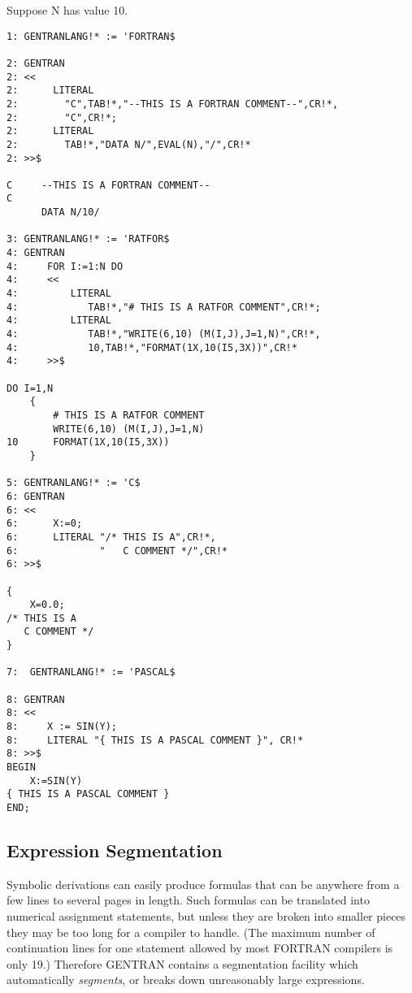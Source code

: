 \begin{describe}{\example}
Suppose N has value 10.
\begin{verbatim}
1: GENTRANLANG!* := 'FORTRAN$ 

2: GENTRAN 
2: << 
2:      LITERAL 
2:        "C",TAB!*,"--THIS IS A FORTRAN COMMENT--",CR!*, 
2:        "C",CR!*; 
2:      LITERAL 
2:        TAB!*,"DATA N/",EVAL(N),"/",CR!* 
2: >>$ 

C     --THIS IS A FORTRAN COMMENT--
C
      DATA N/10/

3: GENTRANLANG!* := 'RATFOR$ 
4: GENTRAN 
4:     FOR I:=1:N DO 
4:     << 
4:         LITERAL 
4:            TAB!*,"# THIS IS A RATFOR COMMENT",CR!*; 
4:         LITERAL 
4:            TAB!*,"WRITE(6,10) (M(I,J),J=1,N)",CR!*, 
4:            10,TAB!*,"FORMAT(1X,10(I5,3X))",CR!* 
4:     >>$ 

DO I=1,N
    {
        # THIS IS A RATFOR COMMENT
        WRITE(6,10) (M(I,J),J=1,N)
10      FORMAT(1X,10(I5,3X))
    }

5: GENTRANLANG!* := 'C$ 
6: GENTRAN 
6: << 
6:      X:=0; 
6:      LITERAL "/* THIS IS A",CR!*, 
6:              "   C COMMENT */",CR!* 
6: >>$ 

{
    X=0.0;
/* THIS IS A
   C COMMENT */
}

7:  GENTRANLANG!* := 'PASCAL$

8: GENTRAN
8: <<
8:     X := SIN(Y);
8:     LITERAL "{ THIS IS A PASCAL COMMENT }", CR!*
8: >>$
BEGIN
    X:=SIN(Y)
{ THIS IS A PASCAL COMMENT }
END;

\end{verbatim}
\end{describe}
\subsection{Expression Segmentation}
\label{segmentation} 
Symbolic derivations can easily produce formulas that can be anywhere
from a few lines to several pages in length.  Such formulas
can be translated into numerical assignment statements, but unless they
are broken into smaller pieces they may be too long for a compiler
to handle.  (The maximum number of continuation lines for one statement
allowed by most FORTRAN compilers is only 19.)  Therefore GENTRAN
contains a segmentation facility which automatically {\it segments},
or breaks down unreasonably large expressions.

